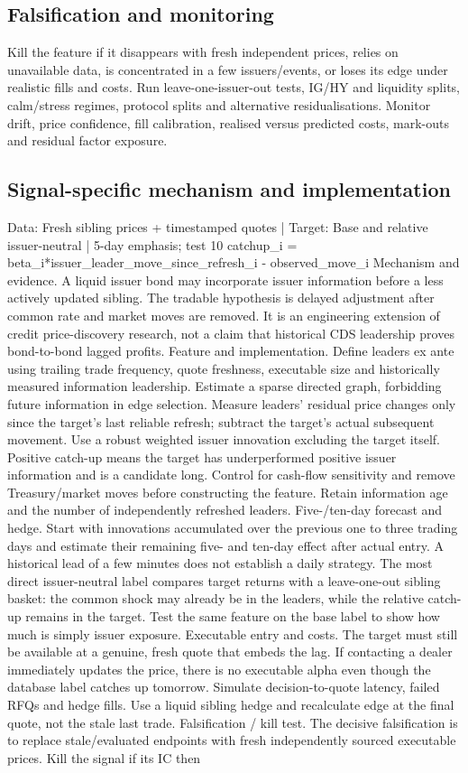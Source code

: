 \documentclass[10pt]{article}
\begin{document}
\subsection{Falsification and monitoring}
Kill the feature if it disappears with fresh independent prices, relies on unavailable data, is concentrated in a few issuers/events, or loses its edge under realistic fills and costs. Run leave-one-issuer-out tests, IG/HY and liquidity splits, calm/stress regimes, protocol splits and alternative residualisations. Monitor drift, price confidence, fill calibration, realised versus predicted costs, mark-outs and residual factor exposure.
\subsection{Signal-specific mechanism and implementation}
Data: Fresh sibling prices + timestamped quotes  |  Target: Base and relative issuer-neutral  |  5-day emphasis; test 10 catchup\_i = beta\_i*issuer\_leader\_move\_since\_refresh\_i - observed\_move\_i Mechanism and evidence.  A liquid issuer bond may incorporate issuer information before a less actively updated sibling. The tradable hypothesis is delayed adjustment after common rate and market moves are removed. It is an engineering extension of credit price-discovery research, not a claim that historical CDS leadership proves bond-to-bond lagged profits. Feature and implementation.  Define leaders ex ante using trailing trade frequency, quote freshness, executable size and historically measured information leadership. Estimate a sparse directed graph, forbidding future information in edge selection. Measure leaders’ residual price changes only since the target’s last reliable refresh; subtract the target’s actual subsequent movement. Use a robust weighted issuer innovation excluding the target itself. Positive catch-up means the target has underperformed positive issuer information and is a candidate long. Control for cash-flow sensitivity and remove Treasury/market moves before constructing the feature. Retain information age and the number of independently refreshed leaders. Five-/ten-day forecast and hedge.  Start with innovations accumulated over the previous one to three trading days and estimate their remaining five- and ten-day effect after actual entry. A historical lead of a few minutes does not establish a daily strategy. The most direct issuer-neutral label compares target returns with a leave-one-out sibling basket: the common shock may already be in the leaders, while the relative catch-up remains in the target. Test the same feature on the base label to show how much is simply issuer exposure. Executable entry and costs.  The target must still be available at a genuine, fresh quote that embeds the lag. If contacting a dealer immediately updates the price, there is no executable alpha even though the database label catches up tomorrow. Simulate decision-to-quote latency, failed RFQs and hedge fills. Use a liquid sibling hedge and recalculate edge at the final quote, not the stale last trade. Falsification / kill test.  The decisive falsification is to replace stale/evaluated endpoints with fresh independently sourced executable prices. Kill the signal if its IC then 
\end{document}

